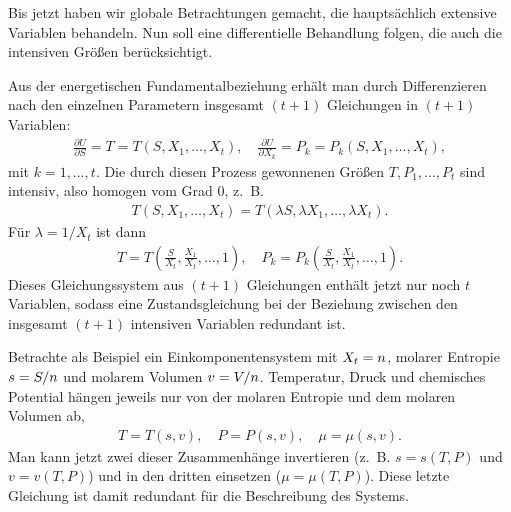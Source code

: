 Bis jetzt haben wir globale Betrachtungen gemacht, die hauptsächlich extensive Variablen behandeln. Nun soll eine differentielle Behandlung folgen, die auch die intensiven Größen berücksichtigt.

Aus der energetischen Fundamentalbeziehung erhält man durch Differenzieren nach den einzelnen Parametern insgesamt $(t+1)$ Gleichungen in $(t+1)$ Variablen:
\begin{align*}
    \frac{\partial U}{\partial S} = T = T(S,X_1,\ldots ,X_t), \quad
    \frac{\partial U}{\partial X_k} =P_k = P_k(S,X_1,\ldots ,X_t),
\end{align*}
mit $k=1,\dots,t$. Die durch diesen Prozess gewonnenen Größen $T,P_1,\ldots,P_t$ sind intensiv, also homogen vom Grad $0$, z.~B.
\begin{align*}
    T(S,X_1,\ldots ,X_t)=T(\lambda S,\lambda X_1,\ldots ,\lambda X_t).
\end{align*}
Für $\lambda=1/X_t$ ist dann
\begin{align*}
    T = T\left(\frac{S}{X_t},\frac{X_1}{X_t},\ldots ,1\right), \quad P_k=P_k\left(\frac{S}{X_t},\frac{X_1}{X_t},\ldots ,1\right).
\end{align*}
Dieses Gleichungssystem aus $(t+1)$ Gleichungen enthält jetzt nur noch $t$ Variablen, sodass eine Zustandsgleichung bei der Beziehung zwischen den insgesamt $(t+1)$ intensiven Variablen redundant ist.

Betrachte als Beispiel ein Einkomponentensystem mit $X_t=n$, molarer Entropie $s=S/n$ und molarem Volumen $v=V/n$. Temperatur, Druck und chemisches Potential hängen jeweils nur von der molaren Entropie und dem molaren Volumen ab,
\begin{align*}
    T=T(s,v), \quad P=P(s,v), \quad \mu=\mu(s,v).
\end{align*}
Man kann jetzt zwei dieser Zusammenhänge invertieren (z.~B. $s=s(T,P)$ und $v=v(T,P)$) und in den dritten einsetzen ($\mu=\mu(T,P)$). Diese letzte Gleichung ist damit redundant für die Beschreibung des Systems.

